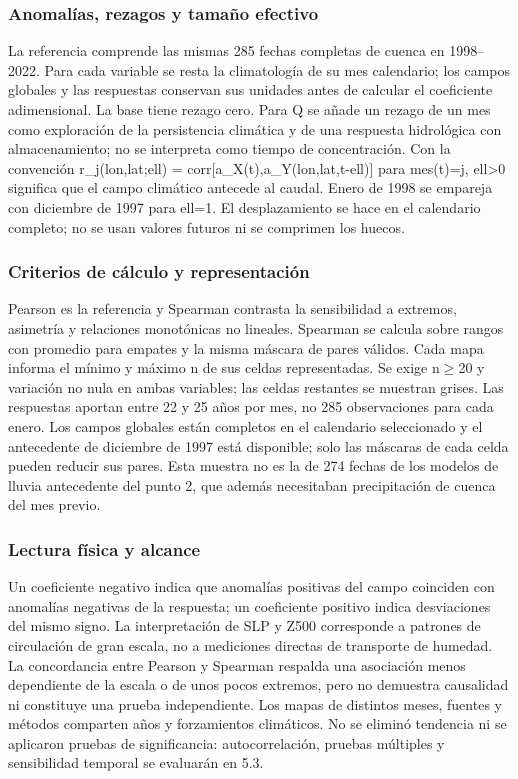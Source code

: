 \documentclass[10pt,a4paper]{article}
\begin{document}
\subsubsection*{Anomalías, rezagos y tamaño efectivo}
La referencia comprende las mismas 285 fechas completas de cuenca en 1998–2022. Para cada variable se resta la climatología de su mes calendario; los campos globales y las respuestas conservan sus unidades antes de calcular el coeficiente adimensional. La base tiene rezago cero. Para Q se añade un rezago de un mes como exploración de la persistencia climática y de una respuesta hidrológica con almacenamiento; no se interpreta como tiempo de concentración. Con la convención r\_j(lon,lat;ell) = corr[a\_X(t),a\_Y(lon,lat,t-ell)] para mes(t)=j, ell>0 significa que el campo climático antecede al caudal. Enero de 1998 se empareja con diciembre de 1997 para ell=1. El desplazamiento se hace en el calendario completo; no se usan valores futuros ni se comprimen los huecos.

\subsubsection*{Criterios de cálculo y representación}
Pearson es la referencia y Spearman contrasta la sensibilidad a extremos, asimetría y relaciones monotónicas no lineales. Spearman se calcula sobre rangos con promedio para empates y la misma máscara de pares válidos. Cada mapa informa el mínimo y máximo n de sus celdas representadas. Se exige n$\geq$20 y variación no nula en ambas variables; las celdas restantes se muestran grises. Las respuestas aportan entre 22 y 25 años por mes, no 285 observaciones para cada enero. Los campos globales están completos en el calendario seleccionado y el antecedente de diciembre de 1997 está disponible; solo las máscaras de cada celda pueden reducir sus pares. Esta muestra no es la de 274 fechas de los modelos de lluvia antecedente del punto 2, que además necesitaban precipitación de cuenca del mes previo.

\subsubsection*{Lectura física y alcance}
Un coeficiente negativo indica que anomalías positivas del campo coinciden con anomalías negativas de la respuesta; un coeficiente positivo indica desviaciones del mismo signo. La interpretación de SLP y Z500 corresponde a patrones de circulación de gran escala, no a mediciones directas de transporte de humedad. La concordancia entre Pearson y Spearman respalda una asociación menos dependiente de la escala o de unos pocos extremos, pero no demuestra causalidad ni constituye una prueba independiente. Los mapas de distintos meses, fuentes y métodos comparten años y forzamientos climáticos. No se eliminó tendencia ni se aplicaron pruebas de significancia: autocorrelación, pruebas múltiples y sensibilidad temporal se evaluarán en 5.3.
\end{document}
